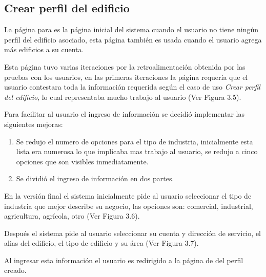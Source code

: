 

\subsection{Crear perfil del edificio}

La página para  es la página inicial del
sistema cuando el usuario no tiene ningún perfil del edificio asociado, esta página
también es usada cuando el usuario agrega más edificios a su cuenta.

Esta página tuvo varias iteraciones por la retroalimentación obtenida por las
pruebas con los usuarios, en las primeras iteraciones la página requería que el
usuario contestara toda la información requerida según el caso de uso
\textit{Crear perfil del edificio}, lo cual representaba mucho trabajo al usuario
(Ver Figura 3.5).


Para facilitar al usuario el ingreso de información se decidió implementar
las siguientes mejoras:

\begin{enumerate}
\item Se redujo el numero de opciones para el tipo de industria, inicialmente
  esta lista era numerosa lo que implicaba mas trabajo al usuario, se redujo
  a cinco opciones que son visibles inmediatamente.
\item Se dividió el ingreso de información en dos partes.
\end{enumerate}

En la versión final el sistema inicialmente pide al usuario seleccionar el tipo
de industria que mejor describe su negocio, las opciones son: comercial, industrial,
agricultura, agrícola, otro (Ver Figura 3.6).


Después el sistema pide al usuario seleccionar su cuenta y dirección
de servicio, el alias del edificio, el tipo de edificio y su área
(Ver Figura 3.7).


Al ingresar esta información el usuario es redirigido a la página de
 del perfil creado.

